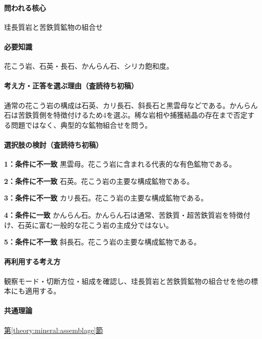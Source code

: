 \paragraph{問われる核心} 珪長質岩と苦鉄質鉱物の組合せ

\paragraph{必要知識} 花こう岩、石英・長石、かんらん石、シリカ飽和度。

\paragraph{考え方・正答を選ぶ理由（査読待ち初稿）} 通常の花こう岩の構成は石英、カリ長石、斜長石と黒雲母などである。かんらん石は苦鉄質側を特徴付けるため4を選ぶ。稀な岩相や捕獲結晶の存在まで否定する問題ではなく、典型的な鉱物組合せを問う。

\paragraph{選択肢の検討（査読待ち初稿）}\mbox{}\par

\noindent\textbf{1：条件に不一致} 黒雲母。花こう岩に含まれる代表的な有色鉱物である。\par

\noindent\textbf{2：条件に不一致} 石英。花こう岩の主要な構成鉱物である。\par

\noindent\textbf{3：条件に不一致} カリ長石。花こう岩の主要な構成鉱物である。\par

\noindent\textbf{4：条件に一致} かんらん石。かんらん石は通常、苦鉄質・超苦鉄質岩を特徴付け、石英に富む一般的な花こう岩の主成分ではない。\par

\noindent\textbf{5：条件に不一致} 斜長石。花こう岩の主要な構成鉱物である。\par

\paragraph{再利用する考え方} 観察モード・切断方位・組成を確認し、珪長質岩と苦鉄質鉱物の組合せを他の標本にも適用する。

\paragraph{共通理論} \hyperref[theory:mineral:assemblage]{第\ref*{theory:mineral:assemblage}節}


